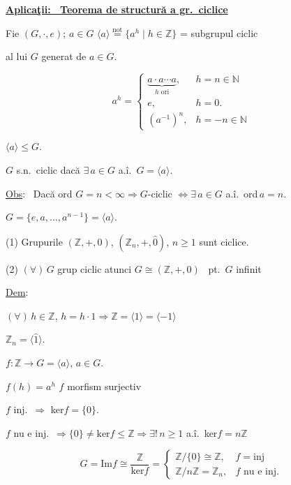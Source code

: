 \documentclass[12pt]{article}
\begin{document}
\noindent\underline{\textbf{Aplicaţii: \ Teorema de structură a gr.\ ciclice}}

\bigskip
\noindent Fie $(G,\cdot,e)$; $a\in G$ \quad $\langle a\rangle \overset{\text{not}}{=} \{a^h \mid h\in\mathbb{Z}\}$ = subgrupul ciclic

\noindent al lui $G$ generat de $a\in G$.

\[
a^h =
\begin{cases}
\underbrace{a\cdot a\cdots a}_{h \text{ ori}}, & h=n\in\mathbb{N} \\
e, & h=0. \\
(a^{-1})^n, & h=-n\in\mathbb{N}
\end{cases}
\]

\noindent $\langle a\rangle \leq G$.

\bigskip
\noindent $G$ s.n.\ ciclic dacă $\exists\,a\in G$ a.î.\ $G=\langle a\rangle$.

\bigskip
\noindent\underline{Obs}: \ Dacă ord $G=n<\infty \Rightarrow G$-ciclic $\Leftrightarrow \exists\,a\in G$ a.î.\ ord$\,a=n$.

\noindent $G=\{e,a,\ldots,a^{n-1}\} = \langle a\rangle$.

\bigskip
\noindent (1) Grupurile $(\mathbb{Z},+,0)$, $(\mathbb{Z}_n,+,\hat 0)$, $n\geq 1$ sunt ciclice.

\noindent (2) $(\forall)\,G$ grup ciclic atunci $G\cong (\mathbb{Z},+,0)$ \ pt.\ $G$ infinit

\bigskip
\noindent\underline{Dem}:

\noindent $(\forall)\,h\in\mathbb{Z}$, $h=h\cdot 1 \Rightarrow \mathbb{Z} = \langle 1\rangle = \langle -1\rangle$

\noindent $\mathbb{Z}_n = \langle\hat 1\rangle$.

\bigskip
\noindent $f: \mathbb{Z}\to G=\langle a\rangle$, $a\in G$.

\noindent $f(h)=a^h$ \quad $f$ morfism surjectiv

\bigskip
\noindent $f$ inj.\ $\Rightarrow$ ker$f=\{0\}$.

\noindent $f$ nu e inj.\ $\Rightarrow \{0\}\neq\text{ker}f\leq\mathbb{Z} \Rightarrow \exists!\,n\geq 1$ a.î.\ ker$f=n\mathbb{Z}$

\[
G=\text{Im}f \cong \frac{\mathbb{Z}}{\text{ker}f} =
\begin{cases}
\mathbb{Z}/\{0\} \cong \mathbb{Z}, & f=\text{inj}\\
\mathbb{Z}/n\mathbb{Z} = \mathbb{Z}_n, & f\text{ nu e inj.}
\end{cases}
\]
\end{document}
